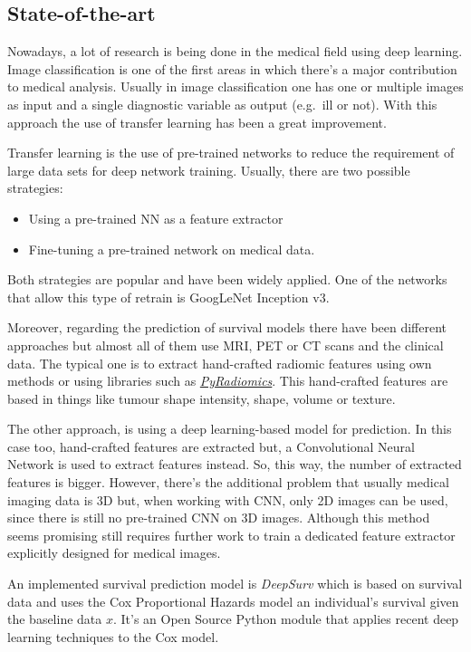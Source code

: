 \subsection{State-of-the-art}

Nowadays, a lot of research is being done in the medical field using deep learning. Image
classification is one of the first areas in which there's a major contribution to medical analysis.
Usually in image classification one has one or multiple images as input and a single diagnostic 
variable as output (e.g.~ill or not). With this approach the use of transfer learning has been a
great improvement.
~\cite{survey-deep-learning}

Transfer learning is the use of pre-trained networks to reduce the requirement of large data
sets for deep network training. Usually, there are two possible strategies: 
\begin{itemize}
  \item Using a pre-trained NN as a feature extractor
  \item Fine-tuning a pre-trained network on medical data.
\end{itemize}
Both strategies are popular and have been widely applied. One of the networks that allow this type
of retrain is GoogLeNet Inception v3.
~\cites{GoogLeNet}{NNRetrain}{inceptionRetrain}

Moreover, regarding the prediction of survival models there have been different approaches but
almost all of them use MRI, PET or CT scans and the clinical data. The typical one is to extract
hand-crafted radiomic features using own methods or using libraries such as
\href{https://github.com/Radiomics/pyradiomics}{\emph{PyRadiomics}}. This hand-crafted features are
based in things like tumour shape intensity, shape, volume or texture.
~\cites{PyRadiomics}{tumour-radiomics}

The other approach, is using a deep learning-based model for prediction. In this case too, 
hand-crafted features are extracted but, a Convolutional Neural Network is used to extract
features instead. So, this way, the number of extracted features is bigger. However,
there's the additional problem that usually medical imaging data is 3D but, when working 
with CNN, only 2D images can be used, since there is still no pre-trained CNN on 3D images.
Although this method seems promising still requires further work to train a dedicated 
feature extractor explicitly designed for medical images.
~\cite{deep-learning-radiomics-gbm}

An implemented survival prediction model is \emph{DeepSurv} which is based on survival data
and uses the Cox Proportional Hazards model an individual's survival given the baseline data
\( x \). It's an Open Source Python module that applies recent deep learning techniques 
to the Cox model.
~\cites{DeepSurv}{Cox}

